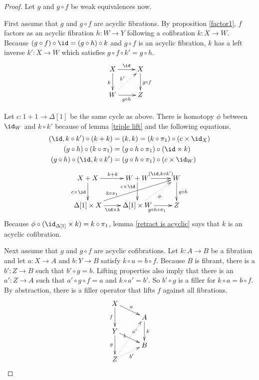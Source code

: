 \documentclass{tac}
\newcommand\of{:}
\newcommand\simplex\Delta
\begin{document}
\begin{proof}
Let $g$ and $g\circ f$ be weak equivalences now. 

First assume that $g$ and $g\circ f$ are acyclic fibrations. By proposition \ref{factor1}, $f$ factors as an acyclic fibration $h\of W\to Y$ following a cofibration $k\of X\to W$. Because $(g\circ f)\circ \id = (g\circ h)\circ k$ and $g\circ f$ is an acyclic fibration, $k$ has a left inverse $k'\of X\to W$ which satisfies $g\circ f\circ k' = g\circ h$. 
\[\xymatrix{
X\ar[d]_k \ar[r]^\id & X\ar[d]^{g\circ f}\\
W\ar[r]_{g\circ h} \ar@{.>}[ur]^{k'} & Z
}\]

Let $c\of 1+1\to\simplex[1]$ be the same cycle as above. There is homotopy $\phi$ between $\id_W$ and $k\circ k'$ because of lemma \ref{triple lift} and the following equations.
\begin{align*}
(\id,k\circ k')\circ(k+k) &= (k,k) = (k\circ\pi_1)\circ (c\times\id_X)\\
(g\circ h)\circ (k\circ \pi_1) &= (g\circ h\circ \pi_1)\circ(\id\times k)\\
(g\circ h)\circ (\id,k\circ k') &= (g\circ h\circ \pi_1)\circ(c\times\id_W)
\end{align*}
\[\xymatrix{
X+X \ar[d]_{c\times \id}\ar[r]^{k+k} & W+W\ar[d]_(.3){c\times\id}\ar[r]^(.6){(\id,k\circ k')} & W\ar[d]^{g\circ h}\\
\simplex[1]\times X \ar[r]_{\id\times k}\ar[urr]^(.3){k\circ\pi_1}& \simplex[1]\times W\ar[r]_{g\circ h\circ \pi_1}\ar@{.>}[ur]_\phi & Z
}\]
Because $\phi\circ (\id_{\simplex[1]}\times k)=k\circ \pi_1$, lemma \ref{retract is acyclic} says that $k$ is an acyclic cofibration.

Next assume that $g$ and $g\circ f$ are acyclic cofibrations. Let $k\of A\to B$ be a fibration and let $a\of X\to A$ and $b\of Y\to B$ satisfy $k\circ a=b\circ f$. Because $B$ is fibrant, there is a $b'\of Z\to B$ such that $b'\circ g = b$. Lifting properties also imply that there is an $a'\of Z\to A$ such that $a'\circ g\circ f = a$ and $k\circ a'= b'$. So $b'\circ g$ is a filler for $k\circ a=b\circ f$. By abstraction, there is a filler operator that lifts $f$ against all fibrations.
\[\xy
(0,28)*+{X}="x",(14\halfrootthree,21)*+{A}="a",(0,14)*+{Y}="y",(14\halfrootthree,7)*+{B}="b",(0,0)*+{Z}="z"
\ar^a "x";"a" \ar_f "x";"y" \ar^k "a";"b" \ar|(.33)b "y";"b" \ar_g "y";"z"
\ar@{.>}_{b'} "z";"b" \ar@{.>}|(.67){a'} "z";"a"
\endxy\]


\end{proof}
\end{document}

